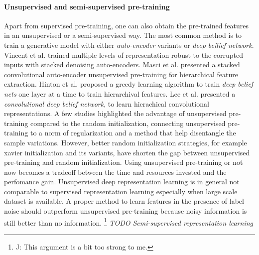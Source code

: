 \paragraph{Unsupervised and semi-supervised pre-training}
Apart from supervised pre-training, one can also obtain the pre-trained features in an  unsupervised or a semi-supervised way.
The most common method is to train a generative model with either \textit{auto-encoder} variants or \textit{deep beilief network}.
Vincent et al.\cite{vincent2010stacked} trained multiple levels of representation robust to the corrupted inputs with stacked denoising auto-encoders.
Masci et al.\cite{masci2011stacked} presented a stacked convolutional auto-encoder unsupervised pre-training for hierarchical feature extraction.
Hinton et al.\cite{hinton2006fast} proposed a greedy learning algorithm to train \textit{deep belief nets} one layer at a time to train hierarchival features.
Lee et al.\cite{lee2009convolutional} presented a \textit{convolutional deep belief network}, to learn hierachical convolutional representations.
A few studies\cite{erhan2009difficulty,erhan2010does,bengio2012deep} highlighted the advantage of unsupervised pre-training compared to the random initialization, connecting unsupervised pre-training to a norm of regularization and a method that help disentangle the sample variations.
However, better random initialization strategies, for example xavier initialization\cite{glorot2010understanding} and its variants, have shorten the gap between unsupervised pre-training and random initialization.
Using unsupervised pre-training or not now becomes a tradeoff between the time and resources invested and the perfomance gain.
Unsupervised deep representation learning is in general not comparable to supervised representation learning especially when large scale dataset is available.
A proper method to learn features in the presence of label noise should outperform  unsupervised pre-training because noisy information is still better than no information.
\footnote{J: This argument is a bit too strong to me.}
\textit{TODO Semi-supervised representation learning}

